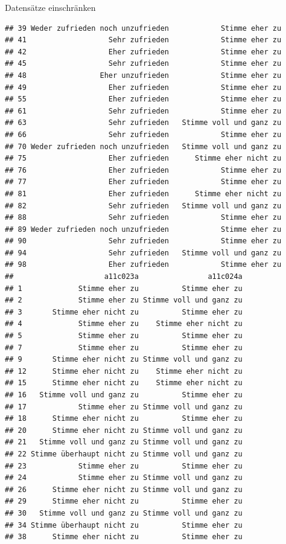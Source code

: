 \documentclass[ignorenonframetext,]{beamer}
\begin{document}
\begin{frame}[fragile]{Datensätze einschränken}
\begin{verbatim}
## 39 Weder zufrieden noch unzufrieden            Stimme eher zu
## 41                   Sehr zufrieden            Stimme eher zu
## 42                   Eher zufrieden            Stimme eher zu
## 45                   Sehr zufrieden            Stimme eher zu
## 48                 Eher unzufrieden            Stimme eher zu
## 49                   Eher zufrieden            Stimme eher zu
## 55                   Eher zufrieden            Stimme eher zu
## 61                   Sehr zufrieden            Stimme eher zu
## 63                   Sehr zufrieden   Stimme voll und ganz zu
## 66                   Sehr zufrieden            Stimme eher zu
## 70 Weder zufrieden noch unzufrieden   Stimme voll und ganz zu
## 75                   Eher zufrieden      Stimme eher nicht zu
## 76                   Eher zufrieden            Stimme eher zu
## 77                   Eher zufrieden            Stimme eher zu
## 81                   Eher zufrieden      Stimme eher nicht zu
## 82                   Sehr zufrieden   Stimme voll und ganz zu
## 88                   Sehr zufrieden            Stimme eher zu
## 89 Weder zufrieden noch unzufrieden            Stimme eher zu
## 90                   Sehr zufrieden            Stimme eher zu
## 94                   Sehr zufrieden   Stimme voll und ganz zu
## 98                   Eher zufrieden            Stimme eher zu
##                     a11c023a                a11c024a
## 1             Stimme eher zu          Stimme eher zu
## 2             Stimme eher zu Stimme voll und ganz zu
## 3       Stimme eher nicht zu          Stimme eher zu
## 4             Stimme eher zu    Stimme eher nicht zu
## 5             Stimme eher zu          Stimme eher zu
## 7             Stimme eher zu          Stimme eher zu
## 9       Stimme eher nicht zu Stimme voll und ganz zu
## 12      Stimme eher nicht zu    Stimme eher nicht zu
## 15      Stimme eher nicht zu    Stimme eher nicht zu
## 16   Stimme voll und ganz zu          Stimme eher zu
## 17            Stimme eher zu Stimme voll und ganz zu
## 18      Stimme eher nicht zu          Stimme eher zu
## 20      Stimme eher nicht zu Stimme voll und ganz zu
## 21   Stimme voll und ganz zu Stimme voll und ganz zu
## 22 Stimme überhaupt nicht zu Stimme voll und ganz zu
## 23            Stimme eher zu          Stimme eher zu
## 24            Stimme eher zu Stimme voll und ganz zu
## 26      Stimme eher nicht zu Stimme voll und ganz zu
## 29      Stimme eher nicht zu          Stimme eher zu
## 30   Stimme voll und ganz zu Stimme voll und ganz zu
## 34 Stimme überhaupt nicht zu          Stimme eher zu
## 38      Stimme eher nicht zu          Stimme eher zu

\end{verbatim}
\end{frame}
\end{document}
